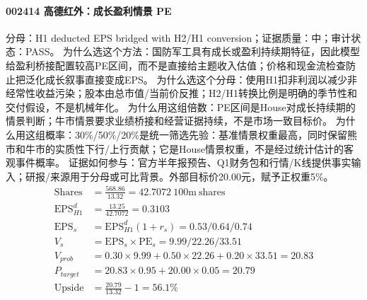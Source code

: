 \paragraph{002414 高德红外：成长盈利情景 PE}
分母：H1 deducted EPS bridged with H2/H1 conversion；证据质量：中；审计状态：PASS。
为什么选这个方法：国防军工具有成长或盈利持续期特征，因此模型给盈利桥接配置较高PE区间，而不是直接给主题收入估值；价格和现金流检查防止把泛化成长叙事直接变成EPS。
为什么选这个分母：使用H1扣非利润以减少非经常性收益污染；股本由总市值/当前价反推；H2/H1转换比例是明确的季节性和交付假设，不是机械年化。
为什么用这组倍数：PE区间是House对成长持续期的情景判断；牛市情景要求业绩桥接和经营证据持续，不是市场一致目标价。
为什么用这组概率：30\%/50\%/20\%是统一筛选先验：基准情景权重最高，同时保留熊市和牛市的实质性下行/上行贡献；它是House情景权重，不是经过统计估计的客观事件概率。
证据如何参与：官方半年报预告、Q1财务包和行情/K线提供事实输入；研报/来源用于分母或可比背景。外部目标价20.00元，赋予正权重5\%。
\begin{align*}
\mathrm{Shares} &= \frac{568.86}{13.32}=42.7072\ \mathrm{100m\ shares}\\
\mathrm{EPS}_{H1}^d &= \frac{13.25}{42.7072}=0.3103\\
\mathrm{EPS}_s &= \mathrm{EPS}_{H1}^d(1+r_s)=0.53/0.64/0.74\\
V_s &= \mathrm{EPS}_s\times \mathrm{PE}_s=9.99/22.26/33.51\\
V_{prob} &= 0.30\times 9.99+0.50\times 22.26+0.20\times 33.51=20.83\\
P_{target} &= 20.83\times 0.95+20.00\times 0.05=20.79\\
\mathrm{Upside} &= \frac{20.79}{13.32}-1=56.1\%\\
\end{align*}

